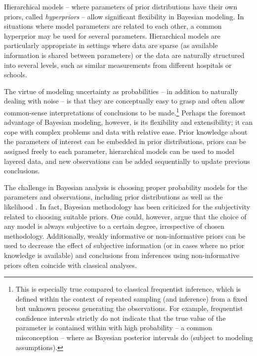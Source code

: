Hierarchical models -- where parameters of prior distributions have their own
priors, called \emph{hyperpriors} -- allow significant flexibility in Bayesian
modeling. In situations where model parameters are related to each other, a
common hyperprior may be used for several parameters. Hierarchical models are
particularly appropriate in settings where data are sparse (as available
information is shared between parameters) or the data are naturally structured
into several levels, such as similar measurements from different hospitals or
schools.

The virtue of modeling uncertainty as probabilities -- in addition to
naturally dealing with noise -- is that they are conceptually easy to grasp
and often allow common-sense interpretations of conclusions to be
made.\footnote{This is especially true compared to classical frequentist inference,
which is defined within the context of repeated sampling (and inference) from
a fixed but unknown process generating the observations. For example,
frequentist confidence intervals strictly do not indicate that the true value
of the parameter is contained within with high probability -- a common
misconception -- where as Bayesian posterior intervals do (subject to modeling
assumptions).} Perhaps the foremost advantage of Bayesian modeling,
however, is its flexibility and extensibility; it can cope with complex
problems and data with relative ease. Prior knowledge about the parameters of
interest can be embedded in prior distributions, priors can be assigned freely
to each parameter, hierarchical models can be used to model layered data, and
new observations can be added sequentially to update previous conclusions.

The challenge in Bayesian analysis is choosing proper probability models for
the parameters and observations, including prior distributions as well as the
likelihood \citep{Gelman2013}. In fact, Bayesian methodology has been
criticized for the subjectivity related to choosing suitable priors. One could, however,
argue that the choice of any model is always subjective to a certain degree,
irrespective of chosen methodology. Additionally, weakly informative or non-informative
priors can be used to decrease the effect of subjective information (or
in cases where no prior knowledge is available) and conclusions from
inferences using non-informative priors often coincide with classical
analyses.


